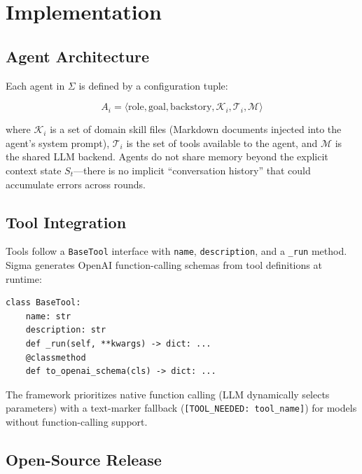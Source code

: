 \documentclass[11pt,a4paper]{article}
\begin{document}
\section{Implementation}

\subsection{Agent Architecture}

Each agent in $\Sigma$ is defined by a configuration tuple:

\begin{equation}
A_i = \langle \text{role}, \text{goal}, \text{backstory}, \mathcal{K}_i, \mathcal{T}_i, \mathcal{M} \rangle
\end{equation}

where $\mathcal{K}_i$ is a set of domain skill files (Markdown documents injected into the agent's system prompt), $\mathcal{T}_i$ is the set of tools available to the agent, and $\mathcal{M}$ is the shared LLM backend. Agents do not share memory beyond the explicit context state $S_t$---there is no implicit ``conversation history'' that could accumulate errors across rounds.

\subsection{Tool Integration}

Tools follow a \texttt{BaseTool} interface with \texttt{name}, \texttt{description}, and a \texttt{\_run} method. Sigma generates OpenAI function-calling schemas from tool definitions at runtime:

\begin{verbatim}
class BaseTool:
    name: str
    description: str
    def _run(self, **kwargs) -> dict: ...
    @classmethod
    def to_openai_schema(cls) -> dict: ...
\end{verbatim}

The framework prioritizes native function calling (LLM dynamically selects parameters) with a text-marker fallback (\texttt{[TOOL\_NEEDED: tool\_name]}) for models without function-calling support.

\subsection{Open-Source Release}
\end{document}
